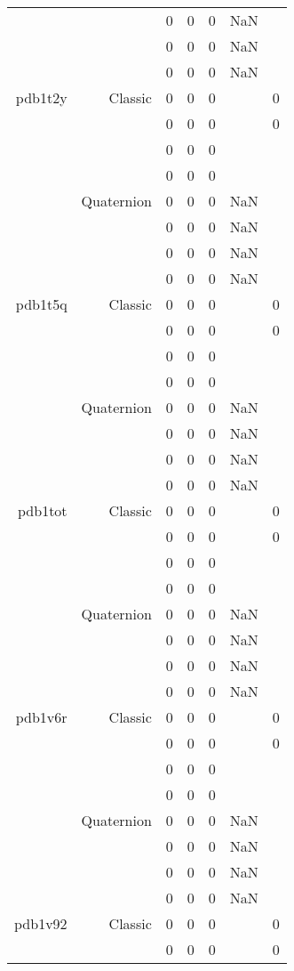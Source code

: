 \begin{xltabular}{\textwidth}{r|rcccSc}
& & 0 & 0 & 0 & NaN & \\
& & 0 & 0 & 0 & NaN & \\
& & 0 & 0 & 0 & NaN & \\ \addlinespace
pdb1t2y & Classic & 0 & 0 & 0 & & 0 \\
& & 0 & 0 & 0 & & 0 \\
& & 0 & 0 & 0 & & \\
& & 0 & 0 & 0 & & \\
& Quaternion & 0 & 0 & 0 & NaN & \\
& & 0 & 0 & 0 & NaN & \\
& & 0 & 0 & 0 & NaN & \\
& & 0 & 0 & 0 & NaN & \\ \addlinespace
pdb1t5q & Classic & 0 & 0 & 0 & & 0 \\
& & 0 & 0 & 0 & & 0 \\
& & 0 & 0 & 0 & & \\
& & 0 & 0 & 0 & & \\
& Quaternion & 0 & 0 & 0 & NaN & \\
& & 0 & 0 & 0 & NaN & \\
& & 0 & 0 & 0 & NaN & \\
& & 0 & 0 & 0 & NaN & \\ \addlinespace
pdb1tot & Classic & 0 & 0 & 0 & & 0 \\
& & 0 & 0 & 0 & & 0 \\
& & 0 & 0 & 0 & & \\
& & 0 & 0 & 0 & & \\
& Quaternion & 0 & 0 & 0 & NaN & \\
& & 0 & 0 & 0 & NaN & \\
& & 0 & 0 & 0 & NaN & \\
& & 0 & 0 & 0 & NaN & \\ \addlinespace
pdb1v6r & Classic & 0 & 0 & 0 & & 0 \\
& & 0 & 0 & 0 & & 0 \\
& & 0 & 0 & 0 & & \\
& & 0 & 0 & 0 & & \\
& Quaternion & 0 & 0 & 0 & NaN & \\
& & 0 & 0 & 0 & NaN & \\
& & 0 & 0 & 0 & NaN & \\
& & 0 & 0 & 0 & NaN & \\ \addlinespace
pdb1v92 & Classic & 0 & 0 & 0 & & 0 \\
& & 0 & 0 & 0 & & 0 \\

\end{xltabular}
